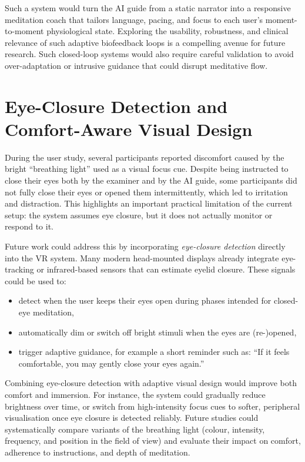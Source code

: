 Such a system would turn the AI guide from a static narrator into a responsive
meditation coach that tailors language, pacing, and focus to each user's
moment-to-moment physiological state. Exploring the usability, robustness,
and clinical relevance of such adaptive biofeedback loops is a compelling
avenue for future research. Such closed-loop systems would also require careful validation to avoid over-adaptation or intrusive guidance that could disrupt meditative flow.


\section{Eye-Closure Detection and Comfort-Aware Visual Design}

During the user study, several participants reported discomfort caused by the
bright ``breathing light'' used as a visual focus cue. Despite being
instructed to close their eyes both by the examiner and by the AI guide, some
participants did not fully close their eyes or opened them intermittently,
which led to irritation and distraction. This highlights an important
practical limitation of the current setup: the system assumes eye closure,
but it does not actually monitor or respond to it.

Future work could address this by incorporating \emph{eye-closure detection}
directly into the VR system. Many modern head-mounted displays already
integrate eye-tracking or infrared-based sensors that can estimate eyelid
closure. These signals could be used to:

\begin{itemize}
    \item detect when the user keeps their eyes open during phases intended for closed-eye meditation,
    \item automatically dim or switch off bright stimuli when the eyes are (re-)opened,
    \item trigger adaptive guidance, for example a short reminder such as:
    ``If it feels comfortable, you may gently close your eyes again.''
\end{itemize}

Combining eye-closure detection with adaptive visual design would improve both
comfort and immersion. For instance, the system could gradually reduce
brightness over time, or switch from high-intensity focus cues to softer,
peripheral visualisation once eye closure is detected reliably. Future studies
could systematically compare variants of the breathing light (colour,
intensity, frequency, and position in the field of view) and evaluate their
impact on comfort, adherence to instructions, and depth of meditation.

